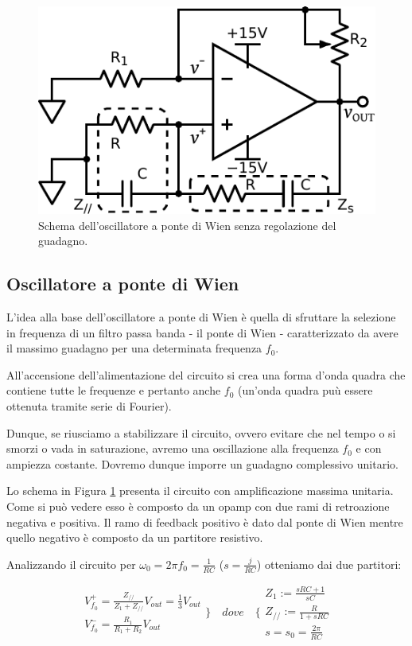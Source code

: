 \begin{figure}
\centering
\includegraphics[width=.35\textwidth]{../E08/latex/osc.pdf}
\caption{Schema dell'oscillatore a ponte di Wien senza regolazione del guadagno.}
\label{cir8:without_lamp}
\end{figure}

\subsection{Oscillatore a ponte di Wien}

L'idea alla base dell'oscillatore a ponte di Wien è quella di sfruttare la selezione in frequenza di un filtro passa banda - il ponte di Wien - caratterizzato da avere il massimo guadagno per una determinata frequenza $f_0$.

All'accensione dell'alimentazione del circuito si crea una forma d'onda quadra che contiene tutte le frequenze e pertanto anche $f_0$ (un'onda quadra puù essere ottenuta tramite serie di Fourier).

Dunque, se riusciamo a stabilizzare il circuito, ovvero evitare che nel tempo o si smorzi o vada in saturazione, avremo una oscillazione alla frequenza $f_0$ e con ampiezza costante. Dovremo dunque imporre un guadagno complessivo unitario.



Lo schema in Figura \ref{cir8:without_lamp} presenta il circuito con amplificazione massima unitaria.
Come si può vedere esso è composto da un opamp con due rami di retroazione negativa e positiva.
Il ramo di feedback positivo è dato dal ponte di Wien mentre quello negativo è composto da un partitore resistivo.

Analizzando il circuito per $\omega_0=2\pi f_0=\frac{1}{RC}$ ($s=\frac{j}{RC}$) otteniamo dai due partitori:

\begin{equation}
  \begin{array}{lr}
	V^+_{f_0} = \frac{Z_{//}}{Z_1 + Z_{//}}V_{out} = \frac{1}{3}V_{out}\\
	V^-_{f_0} = \frac{R_1}{R_1+R_2}V_{out}
  \end{array} \bigg\}
\quad dove \quad %
\Bigg\{
  \begin{array}{lr}
	Z_1 := \frac{sRC+1}{sC}\\
	Z_{//} := \frac{R}{1+sRC}\\
	s = s_0 = \frac{2\pi}{RC}
  \end{array}
\end{equation}

